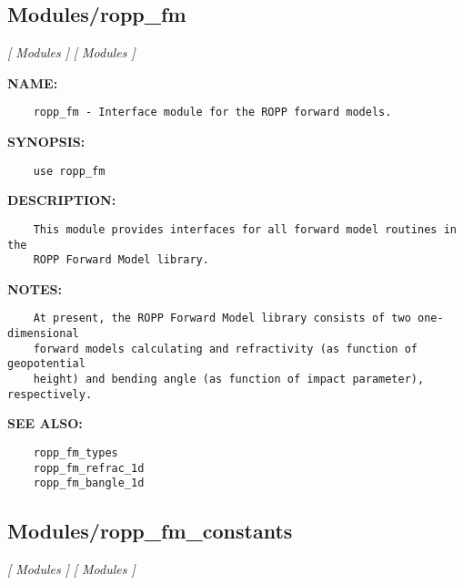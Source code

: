 \subsection{Modules/ropp\_fm}
\textsl{[ Modules ]}
\textsl{[ Modules ]}

\label{ch:robo66}
\label{ch:Modules_ropp_fm}
\textbf{NAME:}\hspace{0.08in}\begin{Verbatim}
    ropp_fm - Interface module for the ROPP forward models.
\end{Verbatim}
\textbf{SYNOPSIS:}\hspace{0.08in}\begin{Verbatim}
    use ropp_fm
\end{Verbatim}
\textbf{DESCRIPTION:}\hspace{0.08in}\begin{Verbatim}
    This module provides interfaces for all forward model routines in the
    ROPP Forward Model library.
\end{Verbatim}
\textbf{NOTES:}\hspace{0.08in}\begin{Verbatim}
    At present, the ROPP Forward Model library consists of two one-dimensional
    forward models calculating and refractivity (as function of geopotential
    height) and bending angle (as function of impact parameter), respectively.
\end{Verbatim}
\textbf{SEE ALSO:}\hspace{0.08in}\begin{Verbatim}
    ropp_fm_types
    ropp_fm_refrac_1d
    ropp_fm_bangle_1d
\end{Verbatim}
\subsection{Modules/ropp\_fm\_constants}
\textsl{[ Modules ]}
\textsl{[ Modules ]}

